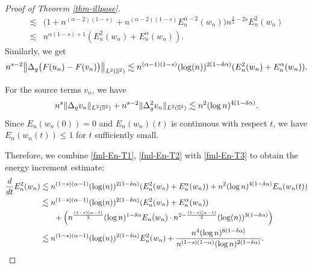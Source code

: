 \documentclass[11pt, reqno]{amsart}
\numberwithin{equation}{section}
\theoremstyle{definition}
\theoremstyle{remark}
\begin{document}
\begin{proof}[Proof of Theorem \ref{thm-illpose}]
\begin{equation*}
\begin{aligned}
\lesssim& \big( 1+n^{(\alpha-2)(1-s)}+n^{(\alpha-2)(1-s)} E^{\alpha-2}_n(w_n) \big) n^{\frac{3}{2}-2s} E^2_n(w_n)\\
\lesssim& n^{\alpha(1-s)+1} ( E_n^2(w_n) + E_n^\alpha(w_n) ) .
\end{aligned}
\end{equation*}
Similarly, we get
\begin{equation}\label{fml-En-T2}
n^{s-2}\big\|\Delta_g \big(F(u_n)-F(v_n)\big) \big\|_{L^2(\Bbb S^2)} \lesssim n^{(\alpha-1)(1-s)} (\log(n))^{2(1-\delta \alpha)} ( E_n^2(w_n) + E_n^\alpha(w_n) ).
\end{equation}
		
For the source terms $v_n$, we have 
\begin{equation}\label{fml-En-T3}
n^s\|\Delta_g v_n\|_{L^2(\Bbb S^2)} + n^{s-2}\|\Delta_g^2 v_n\|_{L^2(\Bbb S^2)} \lesssim n^2 (\log n)^{4(1-\delta \alpha)}.
\end{equation}
Since $E_n(w_n(0)) = 0$ and $E_n(w_n)(t)$ is continuous with respect $t$, we have $E_n(w_n(t)) \leq 1$ for $t$ sufficiently small.  
		
Therefore, we combine \eqref{fml-En-T1}, \eqref{fml-En-T2} with \eqref{fml-En-T3} to obtain the energy increment estimate:
\begin{equation*}
\begin{aligned}
\frac{d}{dt} E_n^2(w_n) &\lesssim n^{(1-s)(\alpha-1)}(\log(n))^{2(1-\delta \alpha)}( E_n^2(w_n) + E_n^\alpha(w_n) ) + n^2 (\log n)^{4(1-\delta \alpha)}E_n(w_n(t))\\
&\lesssim n^{(1-s)(\alpha-1)}(\log(n))^{2(1-\delta \alpha)}( E_n^2(w_n) + E_n^\alpha(w_n) ) \\
&\hspace{4ex} + \Big( n^{\frac{(1-s)(\alpha-1)}{2}}(\log n)^{1-\delta \alpha} E_n(w_n) \cdot n^{2-\frac{(1-s)(\alpha-1)}{2}} (\log(n))^{3(1-\delta \alpha)}\Big)\\
&\lesssim n^{(1-s)(\alpha-1)}(\log(n))^{2(1-\delta \alpha)} E_n^2(w_n)  + \frac{n^4(\log n)^{8(1-\delta \alpha)}}{n^{(1-s)(1-\alpha)} (\log n)^{2(1-\delta \alpha)} }.
\end{aligned}
\end{equation*}
		

\end{proof}
\end{document}
